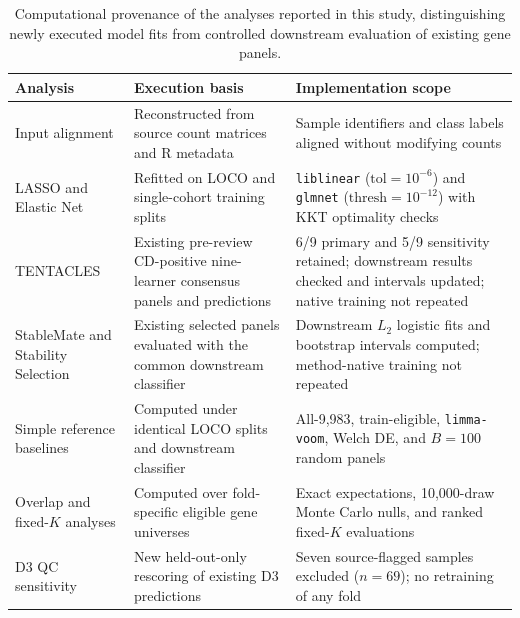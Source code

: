\begin{table}[!htbp]
\centering
\caption{Computational provenance of the analyses reported in this study, distinguishing newly executed model fits from controlled downstream evaluation of existing gene panels.}
\label{tab:s6}
\footnotesize
\renewcommand{\arraystretch}{1.15}
\begin{tabularx}{\textwidth}{@{}p{3.2cm}XX@{}}
\toprule
Analysis & Execution basis & Implementation scope\\
\midrule
Input alignment & Reconstructed from source count matrices and R metadata & Sample identifiers and class labels aligned without modifying counts\\
LASSO and Elastic Net & Refitted on LOCO and single-cohort training splits & \texttt{liblinear} ($\mathrm{tol}=10^{-6}$) and \texttt{glmnet} ($\mathrm{thresh}=10^{-12}$) with KKT optimality checks\\
TENTACLES & Existing pre-review CD-positive nine-learner consensus panels and predictions & 6/9 primary and 5/9 sensitivity retained; downstream results checked and intervals updated; native training not repeated\\
StableMate and Stability Selection & Existing selected panels evaluated with the common downstream classifier & Downstream $L_2$ logistic fits and bootstrap intervals computed; method-native training not repeated\\
Simple reference baselines & Computed under identical LOCO splits and downstream classifier & All-9,983, train-eligible, \texttt{limma-voom}, Welch DE, and $B=100$ random panels\\
Overlap and fixed-$K$ analyses & Computed over fold-specific eligible gene universes & Exact expectations, 10,000-draw Monte Carlo nulls, and ranked fixed-$K$ evaluations\\
D3 QC sensitivity & New held-out-only rescoring of existing D3 predictions & Seven source-flagged samples excluded ($n=69$); no retraining of any fold\\
\bottomrule
\end{tabularx}
\end{table}
